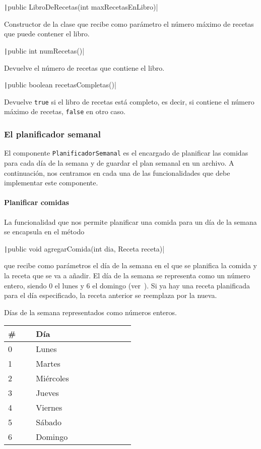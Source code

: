 \documentclass[
    a4paper, %
    12pt, %
]{CSSullivanBusinessReport}
\begin{document}
\texttt|public LibroDeRecetas(int maxRecetasEnLibro)|

Constructor de la clase que recibe como parámetro el número máximo de recetas que puede contener el libro.

\texttt|public int numRecetas()|

Devuelve el número de recetas que contiene el libro.

\texttt|public boolean recetasCompletas()|

Devuelve \texttt{true} si el libro de recetas está completo, es decir, si contiene el número máximo de recetas, \texttt{false} en otro caso.

\subsubsection{El planificador semanal}\label{sec:planificador-semanal}

El componente \texttt{PlanificadorSemanal} es el encargado de planificar las comidas para cada día de la semana y de guardar el plan semanal en un archivo. A continuación, nos centramos en cada una de las funcionalidades que debe implementar este componente.

\paragraph{Planificar comidas}

La funcionalidad que nos permite planificar una comida para un día de la semana se encapsula en el método

\texttt|public void agregarComida(int dia, Receta receta)|

que recibe como parámetros el día de la semana en el que se planifica la comida y la receta que se va a añadir. El día de la semana se representa como un número entero, siendo 0 el lunes y 6 el domingo (ver~). Si ya hay una receta planificada para el día especificado, la receta anterior se reemplaza por la nueva.

\begin{margintable}
    \footnotesize
    \caption{Días de la semana representados como números enteros.}\label{tab:int-semana}
    \begin{tabular}{C{0.1\linewidth} L{0.4\linewidth}}
        \toprule
        \textbf{\#} & \textbf{Día}\\
         & Lunes\\
        1 & Martes\\
        2 & Miércoles\\
        3 & Jueves\\
        4 & Viernes\\
        5 & Sábado\\
        6 & Domingo\\
        \bottomrule
    \end{tabular}
\end{margintable}
\end{document}
